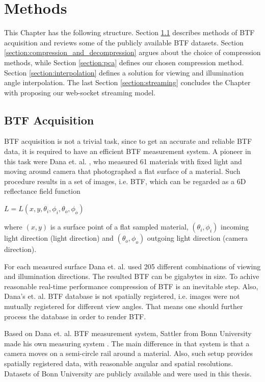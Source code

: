 

\chapter{Methods}
\label{chapter:solutions}


This Chapter has the following structure. Section \ref{section:acquisition}
describes methods of BTF acquisition and reviews some of the publicly available BTF datasets.
 Section \ref{section:compression_and_decompression} argues about the choice of compression methods, while
  Section \ref{section:pca} defines our chosen compression method.
 Section \ref{section:interpolation} defines a solution for viewing and illumination angle interpolation.
The last Section \ref{section:streaming}
concludes the Chapter with proposing our web-socket streaming model. 

\section{BTF Acquisition}
\label{section:acquisition}

BTF acquisition is not a trivial task, since to get an accurate and reliable BTF data, it is required to have an efficient BTF measurement system. 
A pioneer in this task were Dana et. al. \cite{curetDataBase}, who measured 61 materials with fixed light and moving around camera that photographed a flat surface of a material.
Such procedure results in a set of images, i.e. BTF, which can be regarded as a 6D reflectance field function \cite{sattler-2003-efficient} 

{\centering $L=L(x,y,\theta _{i},\phi _{i},\theta _{o},\phi _{o})$ \\}


where $(x,y)$ is a surface point of a flat sampled material, $(\theta _{i},\phi _{i})$ incoming light direction (light direction) and $(\theta _{o},\phi _{o})$ outgoing light direction (camera direction).

For each measured surface Dana et. al. used 205 different combinations of viewing and illumination directions. The resulted BTF can be gigabytes in size. To achive reasonable real-time performance compression of BTF
is an inevitable step. Also, Dana's et. al. BTF database is not spatially registered, i.e. images were not mutually registered for different view angles. That means one should further process the database in order to render BTF.

Based on Dana et. al. BTF measurement system, Sattler from Bonn University made his own measuring system \cite{sattler-2003-efficient}. The main difference in that system is that a camera moves on a semi-circle rail around a material.
Also, such setup provides spatially registered data, with reasonable angular and spatial resolutions. Datasets of Bonn University \cite{btfBonn} are publicly available and were used in this thesis.



